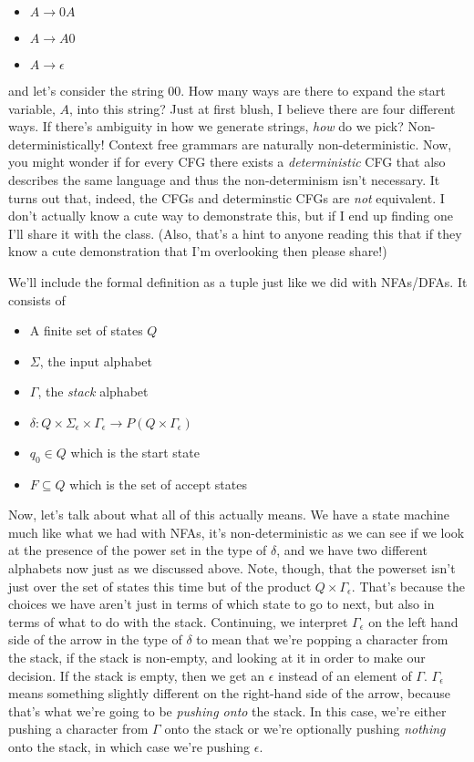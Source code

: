 \documentclass[11pt]{article}
\begin{document}
\begin{itemize}
\item $A \to 0A$
\item $A \to A0$
\item $A \to \epsilon$
\end{itemize}

and let's consider the string $00$. How many ways are there to expand the start variable, $A$, into this string? Just at first blush, I believe there are four different ways. If there's ambiguity in how we generate strings, \emph{how} do we pick? Non-deterministically! Context free grammars are naturally non-deterministic. Now, you might wonder if for every CFG there exists a \emph{deterministic} CFG that also describes the same language and thus the non-determinism isn't necessary. It turns out that, indeed, the CFGs and determinstic CFGs are \emph{not} equivalent. I don't actually know a cute way to demonstrate this, but if I end up finding one I'll share it with the class. (Also, that's a hint to anyone reading this that if they know a cute demonstration that I'm overlooking then please share!)

We'll include the formal definition as a tuple just like we did with NFAs/DFAs. It consists of

\begin{itemize}
\item A finite set of states $Q$
\item $\Sigma$, the input alphabet
\item $\Gamma$, the \emph{stack} alphabet
\item $\delta : Q \times \Sigma_{\epsilon} \times \Gamma_{\epsilon} \to P(Q \times \Gamma_{\epsilon})$
\item $q_0 \in Q$ which is the start state
\item $F \subseteq Q$ which is the set of accept states
\end{itemize}

Now, let's talk about what all of this actually means. We have a state machine much like what we had with NFAs, it's non-deterministic as we can see if we look at the presence of the power set in the type of $\delta$, and we have two different alphabets now just as we discussed above. Note, though, that the powerset isn't just over the set of states this time but of the product $Q \times \Gamma_{\epsilon}$. That's because the choices we have aren't just in terms of which state to go to next, but also in terms of what to do with the stack. Continuing, we interpret $\Gamma_{\epsilon}$ on the left hand side of the arrow in the type of $\delta$ to mean that we're popping a character from the stack, if the stack is non-empty, and looking at it in order to make our decision. If the stack is empty, then we get an $\epsilon$ instead of an element of $\Gamma$. $\Gamma_{\epsilon}$ means something slightly different on the right-hand side of the arrow, because that's what we're going to be \emph{pushing onto} the stack. In this case, we're either pushing a character from $\Gamma$ onto the stack or we're optionally pushing \emph{nothing} onto the stack, in which case we're pushing $\epsilon$. 
\end{document}

